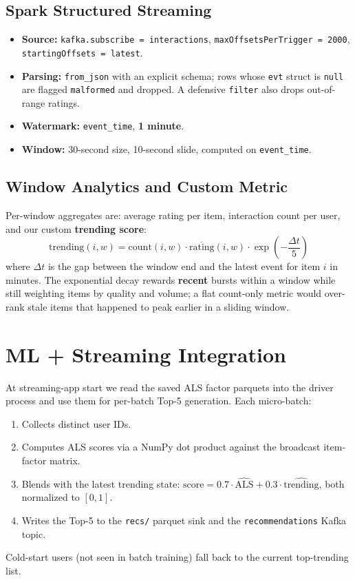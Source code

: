 \documentclass[11pt,a4paper]{article}
\begin{document}
\subsection{Spark Structured Streaming}
\begin{itemize}[noitemsep]
  \item \textbf{Source:} \texttt{kafka.subscribe = interactions},
        \texttt{maxOffsetsPerTrigger = 2000}, \texttt{startingOffsets = latest}.
  \item \textbf{Parsing:} \texttt{from\_json} with an explicit schema; rows
        whose \texttt{evt} struct is \texttt{null} are flagged \texttt{malformed}
        and dropped. A defensive \texttt{filter} also drops out-of-range ratings.
  \item \textbf{Watermark:} \texttt{event\_time}, \textbf{1 minute}.
  \item \textbf{Window:} 30-second size, 10-second slide, computed on
        \texttt{event\_time}.
\end{itemize}

\subsection{Window Analytics and Custom Metric}
Per-window aggregates are: average rating per item, interaction count per user,
and our custom \textbf{trending score}:
\[
  \text{trending}(i, w) = \text{count}(i, w) \cdot
  \overline{\text{rating}}(i, w) \cdot
  \exp\!\left(-\frac{\Delta t}{5}\right)
\]
where $\Delta t$ is the gap between the window end and the latest event for
item $i$ in minutes. The exponential decay rewards \textbf{recent} bursts
within a window while still weighting items by quality and volume; a flat
count-only metric would over-rank stale items that happened to peak earlier in
a sliding window.

\section{ML + Streaming Integration}
At streaming-app start we read the saved ALS factor parquets into the driver
process and use them for per-batch Top-5 generation. Each micro-batch:
\begin{enumerate}[noitemsep]
  \item Collects distinct user IDs.
  \item Computes ALS scores via a NumPy dot product against the broadcast
        item-factor matrix.
  \item Blends with the latest trending state:
        $\text{score} = 0.7 \cdot \widehat{\text{ALS}} + 0.3 \cdot
        \widehat{\text{trending}}$, both normalized to $[0,1]$.
  \item Writes the Top-5 to the \texttt{recs/} parquet sink and the
        \texttt{recommendations} Kafka topic.
\end{enumerate}
Cold-start users (not seen in batch training) fall back to the current
top-trending list.
\end{document}
